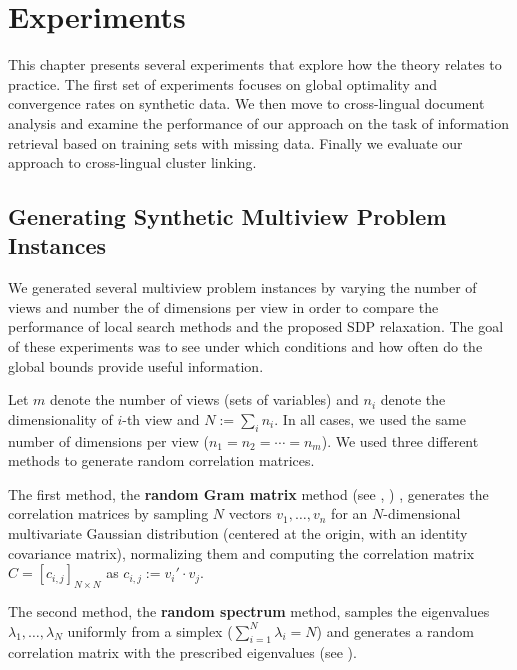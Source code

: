%
\chapter{Experiments}\label{chap:experiments}

This chapter presents several experiments that explore how the theory relates
to practice. The first set of experiments focuses on global optimality
and convergence rates on synthetic data. We then move to
cross-lingual document analysis and examine the performance
of our approach on the task of information retrieval based
on training sets with missing data. Finally we evaluate our
approach to cross-lingual cluster linking.

\section{Generating Synthetic Multiview Problem Instances}\label{chap:experiments:synthetic}

We generated several multiview problem instances by varying the number
of views and number the of dimensions per view in order to
compare the performance of local search methods and the proposed
SDP relaxation. The goal of these experiments was to see
under which conditions and how often do the global bounds
provide useful information.

Let $m$ denote the number of views (sets of variables) and 
$n_i$ denote the dimensionality of $i$-th
view and $N := \sum_i n_i$. In all cases, we used the same number
of dimensions per view ($n_1 = n_2 = \cdots = n_m$). We used
three different methods to generate random correlation matrices.

The first method, the \textbf{random Gram matrix} method (see
\cite{Holmes:1991:RCM:105724.105730}, \cite{Bendel_Mickey_78}) ,
generates the correlation matrices by sampling $N$ vectors $v_1,
\ldots, v_n$ for an $N$-dimensional multivariate Gaussian
distribution (centered at the origin, with an identity covariance
matrix), normalizing them and computing the correlation matrix $C
= \left[c_{i,j}\right]_{N \times N}$ as $c_{i,j} := v_i' \cdot v_j$.

The second method, the \textbf{random spectrum} method,
samples the eigenvalues $\lambda_1,\ldots,\lambda_N$ uniformly
from a simplex ($\sum_{i=1}^{N} \lambda_i = N$) and generates a
random correlation matrix with the prescribed eigenvalues (see
\cite{Bendel_Mickey_78}).

